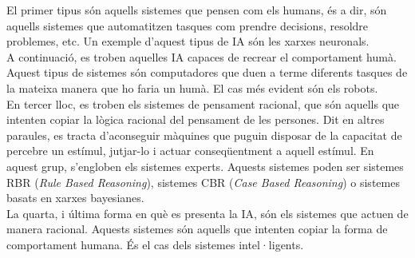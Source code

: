\documentclass[a4paper,12pt]{report}
\begin{document}
El primer tipus són aquells sistemes que pensen com els humans, és a dir, són aquells sistemes que automatitzen tasques com prendre decisions, resoldre problemes, etc. Un exemple d'aquest tipus de IA són les xarxes neuronals.\\
A continuació, es troben aquelles IA capaces de recrear el comportament humà. Aquest tipus de sistemes són computadores que duen a terme diferents tasques de la mateixa manera que ho faria un humà. El cas més evident són els robots.\\
En tercer lloc, es troben els sistemes de pensament racional, que són aquells que intenten copiar la lògica racional del pensament de les persones. Dit en altres paraules, es tracta d'aconseguir màquines que puguin disposar de la capacitat de percebre un estímul, jutjar-lo i actuar conseqüentment a aquell estímul. En aquest grup, s'engloben els sistemes experts. Aquests sistemes poden ser sistemes RBR (\textit{Rule Based Reasoning}), sistemes CBR (\textit{Case Based Reasoning}) o sistemes basats en xarxes bayesianes.\\
La quarta, i última forma en què es presenta la IA, són els sistemes que actuen de manera racional. Aquests sistemes són aquells que intenten copiar la forma de comportament humana. És el cas dels sistemes intel·ligents.
\end{document}
